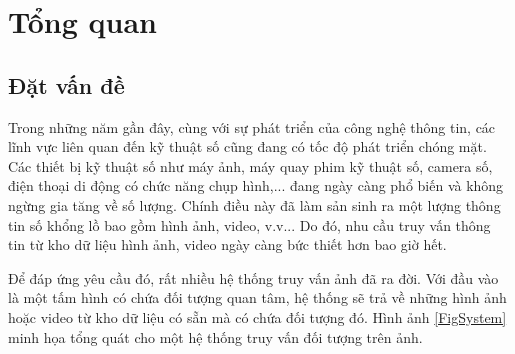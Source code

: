 
\chapter{Tổng quan}
\ifpdf
    \graphicspath{{Chapter1/Chapter1Figs/PNG/}{Chapter1/Chapter1Figs/PDF/}{Chapter1/Chapter1Figs/}}
\else
    \graphicspath{{Chapter1/Chapter1Figs/EPS/}{Chapter1/Chapter1Figs/}}
\fi
{}
\section{Đặt vấn đề}
Trong những năm gần đây, cùng với sự phát triển của công nghệ thông tin, các lĩnh vực liên quan đến kỹ thuật số cũng đang có tốc độ phát triển chóng mặt. Các thiết bị kỹ thuật số như máy ảnh, máy quay phim kỹ thuật số, camera số, điện thoại di động có chức năng chụp hình,... đang ngày càng phổ biến và không ngừng gia tăng về số lượng. Chính điều này đã làm sản sinh ra một lượng thông tin số khổng lồ bao gồm hình ảnh, video, v.v... Do đó, nhu cầu truy vấn thông tin từ kho dữ liệu hình ảnh, video ngày càng bức thiết hơn bao giờ hết.

Để đáp ứng yêu cầu đó, rất nhiều hệ thống truy vấn ảnh đã ra đời. Với đầu vào là một tấm hình có chứa đối tượng quan tâm, hệ thống sẽ trả về những hình ảnh hoặc video từ kho dữ liệu có sẵn mà có chứa đối tượng đó. Hình ảnh \ref{FigSystem} minh họa tổng quát cho một hệ thống truy vấn đối tượng trên ảnh.


